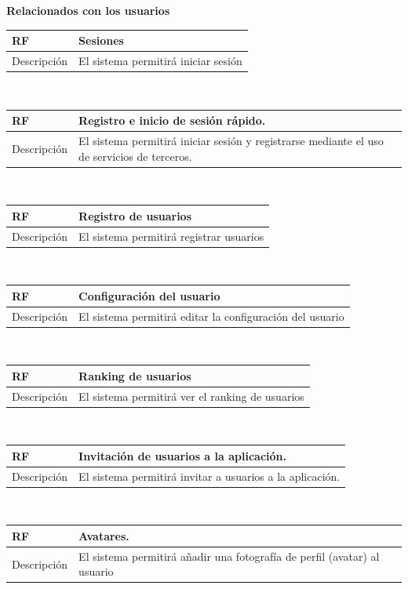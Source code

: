 \documentclass[twoside]{report}
\newcommand\addrow[2]{#1 &#2\\ }
\newcommand\addheading[2]{#1 &#2\\ \hline}
\newcommand\tabularhead{\begin{tabular}{lp{0.7\textwidth}}
\hline
}
\newenvironment{req}{\tabularhead}
{\hline\end{tabular}}
\begin{document}
\textbf{Relacionados con los usuarios}\\

\begin{req}
	\addheading{\textbf{RF\arabic{functionalRequirements}}}{Sesiones}
	\addrow{Descripción}{El sistema permitirá iniciar sesión}
\end{req} \\
 
\begin{req}
	\addheading{\textbf{RF\arabic{functionalRequirements}}}{Registro e inicio de sesión rápido.}
	\addrow{Descripción}{El sistema permitirá iniciar sesión y registrarse mediante el uso de servicios de terceros.}
\end{req} \\

\begin{req}
	\addheading{\textbf{RF\arabic{functionalRequirements}}}{Registro de usuarios}
	\addrow{Descripción}{El sistema permitirá registrar usuarios}
\end{req}\\

\begin{req}
	\addheading{\textbf{RF\arabic{functionalRequirements}}}{Configuración del usuario}
	\addrow{Descripción}{El sistema permitirá editar la configuración del usuario}
\end{req}\\

\begin{req}
	\addheading{\textbf{RF\arabic{functionalRequirements}}}{Ranking de usuarios}
	\addrow{Descripción}{El sistema permitirá ver el ranking de usuarios}
\end{req}\\

\begin{req}
	\addheading{\textbf{RF\arabic{functionalRequirements}}}{Invitación de usuarios a la aplicación.}
	\addrow{Descripción}{El sistema permitirá invitar a usuarios a la aplicación.}
\end{req}\\

\begin{req}
	\addheading{\textbf{RF\arabic{functionalRequirements}}}{Avatares.}
	\addrow{Descripción}{El sistema permitirá añadir una fotografía de perfil (avatar) al usuario}
\end{req}\\
\end{document}
